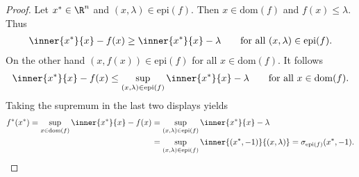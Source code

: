\begin{proof}
  Let $x^*\in\R^n$
  and
  $
    (x,\lambda)\in \mathrm{epi}(f).
  $
  Then
  $
    x \in \mathrm{dom}(f)
  $
  and
  $
    f(x)\le \lambda.
  $
  Thus
  \begin{gather}
    \inner{x^*}{x} - f(x)
    \ge
    \inner{x^*}{x} - \lambda
    \qquad
    \text{for all}\ 
    (x,\lambda)\in \mathrm{epi}(f).
  \end{gather}
  On the other hand 
  $
    (x,f(x))\in \mathrm{epi}(f)
  $
  for all
  $
    x \in \mathrm{dom}(f).
  $
  It follows
  \begin{gather}
    \inner{x^*}{x} - f(x)
    \le
    \sup_{(x,\lambda)\in\mathrm{epi}(f)}
    \inner{x^*}{x} - \lambda
    \qquad
    \text{for all}\ 
    x \in \mathrm{dom}(f).
  \end{gather}
  Taking the supremum in the last two displays yields
  \begin{align}
    f^*(x^*)
    =
    \sup_{x\in\mathrm{dom}(f)}
    \inner{x^*}{x} - f(x)
    &=
    \sup_{(x,\lambda)\in\mathrm{epi}(f)}
    \inner{x^*}{x} - \lambda
    \\
    &=
    \sup_{(x,\lambda)\in\mathrm{epi}(f)}
    \inner{(x^*,-1)}{(x,\lambda)} 
    =
    \sigma_{\mathrm{epi}(f)}
    (x^*,-1).
  \end{align}
\end{proof}
